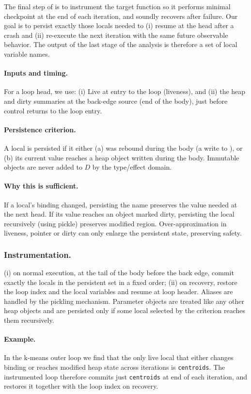 The final step of \spyte is to instrument the target function so it performs minimal checkpoint at the end of each iteration, and soundly recovers after failure. Our goal is to persist exactly those locals needed to (i) resume at the head after a crash and (ii) re-execute the next iteration with the same future observable behavior. The output of the last stage of the analysis is therefore a set of local variable names.

\paragraph{Inputs and timing.}
For a loop head, we use:
(i) Live \tLOCALS at entry to the loop (liveness), and
(ii) the heap and dirty summaries at the back-edge source (end of the body), just before control returns to the loop entry.

\paragraph{Persistence criterion.}
A local is persisted if it either (a) was rebound during the body (a write to \tLOCALS), or (b) its current value reaches a heap object written during the body. Immutable objects are never added to $D$ by the type/effect domain.

\paragraph{Why this is sufficient.}
If a local's binding changed, persisting the name preserves the value needed at the next head.
If its value reaches an object marked dirty, persisting the local recursively (using \eg pickle) preserves modified region.
Over-approximation in liveness, pointer or dirty can only enlarge the persistent state, preserving safety.

\subsubsection{Instrumentation.}
(i) on normal execution, at the tail of the body before the back edge, commit exactly the locals in the persistent set in a fixed order;
(ii) on recovery, restore the loop index and the local variables and resume at loop header. Aliases are handled by the pickling mechanism.
Parameter objects are treated like any other heap objects and are persisted only if some local selected by the criterion reaches them recursively.

\paragraph{Example.}
In the k-means outer loop we find that the only live local that either changes binding or reaches modified heap state across iterations is \texttt{centroids}. The instrumented loop therefore commits just \texttt{centroids} at end of each iteration, and restores it together with the loop index on recovery.
